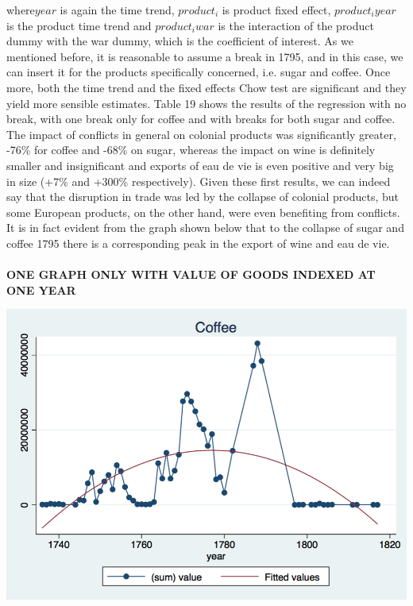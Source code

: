 \documentclass[12pt,a4paper,titlepage,english]{article}
\begin{document}
where$year$ is again the time trend, $product_i$ is product fixed effect, $product_iyear$ is the product time trend and $product_iwar$ is the interaction of the product dummy with the war dummy, which is the coefficient of interest. As we mentioned before, it is reasonable to assume a break in 1795, and in this case, we can insert it for the products specifically concerned, i.e. sugar and coffee. Once more, both the time trend and the fixed effects Chow test are significant and they yield more sensible estimates. Table 19 shows the results of the regression with no break, with one break only for coffee and with breaks for both sugar and coffee. \\
The impact of conflicts in general on colonial products was significantly greater, -76\% for coffee and -68\% on sugar, whereas the impact on wine is definitely smaller and insignificant and exports of eau de vie is even positive and very big in size (+7\% and +300\% respectively).
Given these first results, we can indeed say that the disruption in trade was led by the collapse of colonial products, but some European products, on the other hand, were even benefiting from conflicts. It is in fact evident from the graph shown below that to the collapse of sugar and coffee 1795 there is a corresponding peak in the export of wine and eau de vie.\\~\\
\caption{\textbf{ONE GRAPH ONLY WITH VALUE OF GOODS INDEXED AT ONE YEAR}}
\includegraphics[scale=.28]{coffee_qfit.png}
\end{document}

